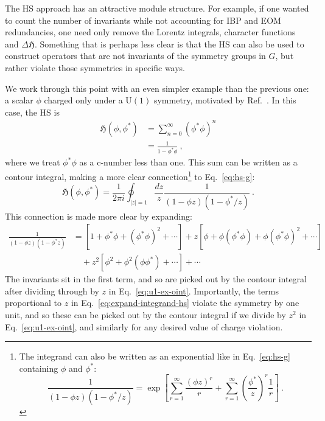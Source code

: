 The HS approach has an attractive module structure. For example, if one wanted
to count the number of invariants while not accounting for IBP and EOM
redundancies, one need only remove the Lorentz integrals, character functions
and $\Delta \mathfrak{H}$. Something that is perhaps less clear is that the HS
can also be used to construct operators that are not invariants of the symmetry
groups in $G$, but rather violate those symmetries in specific ways.

We work through this point with an even simpler example than the previous one: a
scalar $\phi$ charged only under a $\mathrm{U}(1)$ symmetry, motivated by
Ref.~\cite{Lehman:2015via}. In this case, the HS is
\begin{align}
  \mathfrak{H}(\phi, \phi^{*}) &= \sum_{n=0}^{\infty} (\phi^{*}\phi)^{n} \\
  &= \frac{1}{1 - \phi^{*} \phi} \ ,
\end{align}
where we treat $\phi^{*}\phi$ as a c-number less than one. This sum can be
written as a contour integral, making a more clear connection\footnote{The
  integrand can also be written as an exponential like in Eq.~\eqref{eq:hs-g}
  containing $\phi$ and $\phi^{*}$:
\begin{equation*}
  \frac{1}{(1 - \phi z)(1 - \phi^{*}/z)} = \exp \left[ \sum_{r=1}^{\infty} \frac{(\phi z)^{r}}{r} + \sum_{r=1}^{\infty} \left(\frac{\phi^{*}}{z}\right)^{r}\frac{1}{r} \right] \ .
\end{equation*}} to
Eq.~\eqref{eq:hs-g}:
\begin{equation}
  \label{eq:u1-ex-oint}
  \mathfrak{H}(\phi, \phi^{*}) = \frac{1}{2\pi i} \oint_{|z|=1} \frac{dz}{z} \frac{1}{(1 - \phi z)(1 - \phi^{*}/z)} \ .
\end{equation}
This connection is made more clear by expanding:
\begin{equation}
  \label{eq:expand-integrand-hs}
  \begin{aligned}
  \frac{1}{(1 - \phi z)(1 - \phi^{*} z)} &= [1 + \phi^{*}\phi + (\phi^{*}\phi)^{2} + \cdots] + z [\phi + \phi (\phi^{*}\phi) + \phi(\phi^{*}\phi)^{2} + \cdots] \\
 &\quad + z^2 [\phi^2 + \phi^2 (\phi \phi^*) + \cdots] + \cdots
  \end{aligned}
\end{equation}
The invariants sit in the first term, and so are picked out by the contour
integral after dividing through by $z$ in Eq.~\eqref{eq:u1-ex-oint}.
Importantly, the terms proportional to $z$ in Eq.~\eqref{eq:expand-integrand-hs}
violate the symmetry by one unit, and so these can be picked out by the contour
integral if we divide by $z^{2}$ in Eq.~\eqref{eq:u1-ex-oint}, and similarly for
any desired value of charge violation.

